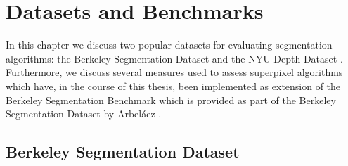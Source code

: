 \chapter{Datasets and Benchmarks}
\label{chapter:datasets}

In this chapter we discuss two popular datasets for evaluating segmentation algorithms: the Berkeley Segmentation Dataset \cite{ArbelaezMaireFowlkesMalik:2011} and the NYU Depth Dataset \cite{SilbermanHoiemKohliFergus:2012}. Furthermore, we discuss several measures used to assess superpixel algorithms which have, in the course of this thesis, been implemented as extension of the Berkeley Segmentation Benchmark which is provided as part of the Berkeley Segmentation Dataset by Arbel\'aez \etal \cite{ArbelaezMaireFowlkesMalik:2011}.

\section{Berkeley Segmentation Dataset}

